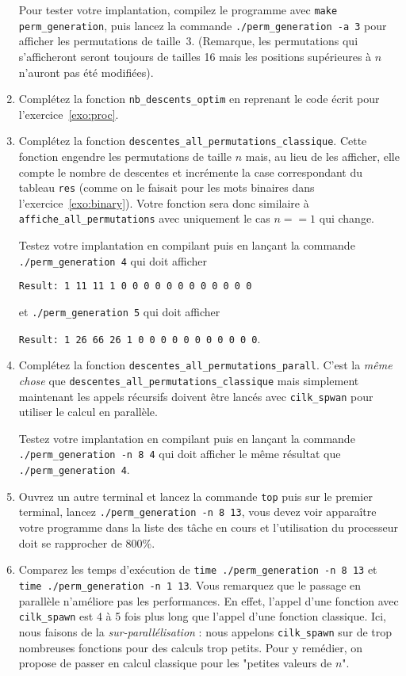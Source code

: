 \documentclass{cours}
\newcommand{\lsti}[1]{\lstinline{#1}{}}
\begin{document}
\begin{exercice}
\begin{enumerate}
Pour tester votre implantation, compilez le programme avec \lsti{make perm_generation}, puis lancez la commande \lsti{./perm_generation -a 3} pour afficher les permutations de taille~3. (Remarque, les permutations qui s'afficheront seront toujours de tailles 16 mais les positions supérieures à $n$ n'auront pas été modifiées).

\item Complétez la fonction \lsti{nb_descents_optim} en reprenant le code écrit pour l'exercice~\ref{exo:proc}.

\item Complétez la fonction \lsti{descentes_all_permutations_classique}. Cette fonction engendre les permutations de taille $n$ mais, au lieu de les afficher, elle compte le nombre de descentes et incrémente la case correspondant du tableau \lsti{res} (comme on le faisait pour les mots binaires dans l'exercice~\ref{exo:binary}). Votre fonction sera donc similaire à \lsti{affiche_all_permutations} avec uniquement le cas $n==1$ qui change.

Testez votre implantation en compilant puis en lançant la commande \lsti{./perm_generation 4} qui doit afficher

\lsti{Result: 1 11 11 1 0 0 0 0 0 0 0 0 0 0 0 0}

et \lsti{./perm_generation 5} qui doit afficher 

\lsti{Result: 1 26 66 26 1 0 0 0 0 0 0 0 0 0 0 0}.

\item Complétez la fonction \lsti{descentes_all_permutations_parall}. C'est la \textit{même chose} que \lsti{descentes_all_permutations_classique} mais simplement maintenant les appels récursifs doivent être lancés avec \lsti{cilk_spwan} pour utiliser le calcul en parallèle. 

Testez votre implantation en compilant puis en lançant la commande \lsti{./perm_generation -n 8 4} qui doit afficher le même résultat que \lsti{./perm_generation 4}.

\item Ouvrez un autre terminal et lancez la commande \lsti{top} puis sur le premier terminal, lancez \lsti{./perm_generation -n 8 13}, vous devez voir apparaître votre programme dans la liste des tâche en cours et l'utilisation du processeur doit se rapprocher de 800\%.

\item Comparez les temps d'exécution de \lsti{time ./perm_generation -n 8 13} et \lsti{time ./perm_generation -n 1 13}. Vous remarquez que le passage en parallèle n'améliore pas les performances. En effet, l'appel d'une fonction avec \lsti{cilk_spawn} est 4  à 5 fois plus long que l'appel d'une fonction classique. Ici, nous faisons de la \textit{sur-parallélisation} : nous appelons \lsti{cilk_spawn} sur de trop nombreuses fonctions pour des calculs trop petits. Pour y remédier, on propose de passer en calcul classique pour les "petites valeurs de $n$". 


\end{enumerate}
\end{exercice}
\end{document}
